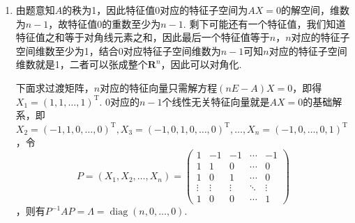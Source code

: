 \documentclass[12pt,fontset=fandol]{ctexart}
\begin{document}
\begin{solve}
\begin{enumerate}
                \item 由题意知$A$的秩为1，因此特征值0对应的特征子空间为$AX=0$的解空间，维数为$n-1$，故特征值0的重数至少为$n-1$. 剩下可能还有一个特征值，我们知道特征值之和等于对角线元素之和，因此最后一个特征值等于$n$，$n$对应的特征子空间维数至少为1，结合0对应特征子空间维数为$n-1$可知$n$对应的特征子空间维数就是1，二者可以张成整个$\mathbf{R}^n$，因此可以对角化.

                      下面求过渡矩阵，$n$对应的特征向量只需解方程$(nE-A)X=0$，即得$X_1=(1,1,\ldots,1)^\mathrm{T}$. 0对应的$n-1$个线性无关特征向量就是$AX=0$的基础解系，即$X_2=(-1,1,0,\ldots,0)^\mathrm{T},X_3=(-1,0,1,0,\ldots,0)^\mathrm{T},\ldots,X_n=(-1,0,\ldots,0,1)^\mathrm{T}$，令
\[P=(X_1,X_2,\ldots,X_n)=\begin{pmatrix}
                              1 & -1 & -1 & \cdots & -1 \\ 1 & 1 & 0 & \cdots & 0 \\ 1 & 0 & 1 & \cdots & 0 \\ \vdots & \vdots & \vdots & \ddots & \vdots \\ 1 & 0 & 0 & \cdots & 1
                          \end{pmatrix}\]
，则有$P^{-1}AP=\Lambda=\operatorname{diag}(n,0,\ldots,0)$.


\end{enumerate}
\end{solve}
\end{document}
